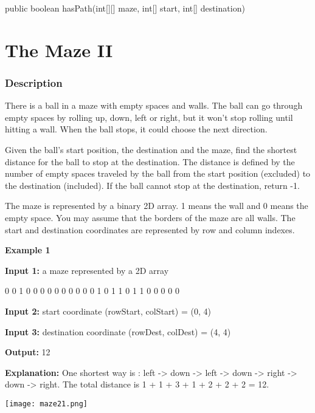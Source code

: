 \begin{Code}
public boolean hasPath(int[][] maze, int[] start, int[] destination) {

}
\end{Code}

\newpage

\section{The Maze II} %

\subsubsection{Description}

There is a ball in a maze with empty spaces and walls. The ball can go through empty spaces by rolling up, down, left or right, but it won't stop rolling until hitting a wall. When the ball stops, it could choose the next direction.

Given the ball's start position, the destination and the maze, find the shortest distance for the ball to stop at the destination. The distance is defined by the number of empty spaces traveled by the ball from the start position (excluded) to the destination (included). If the ball cannot stop at the destination, return -1.

The maze is represented by a binary 2D array. 1 means the wall and 0 means the empty space. You may assume that the borders of the maze are all walls. The start and destination coordinates are represented by row and column indexes.

\textbf{Example 1}

\textbf{Input 1:} a maze represented by a 2D array
\begin{Code}
0 0 1 0 0
0 0 0 0 0
0 0 0 1 0
1 1 0 1 1
0 0 0 0 0
\end{Code}

\textbf{Input 2:} start coordinate (rowStart, colStart) = (0, 4)

\textbf{Input 3:} destination coordinate (rowDest, colDest) = (4, 4)

\textbf{Output:} 12

\textbf{Explanation:} One shortest way is : left -> down -> left -> down -> right -> down -> right.
             The total distance is 1 + 1 + 3 + 1 + 2 + 2 + 2 = 12.

\begin{center}
\texttt{[image: maze21.png]}\\
\end{center}

